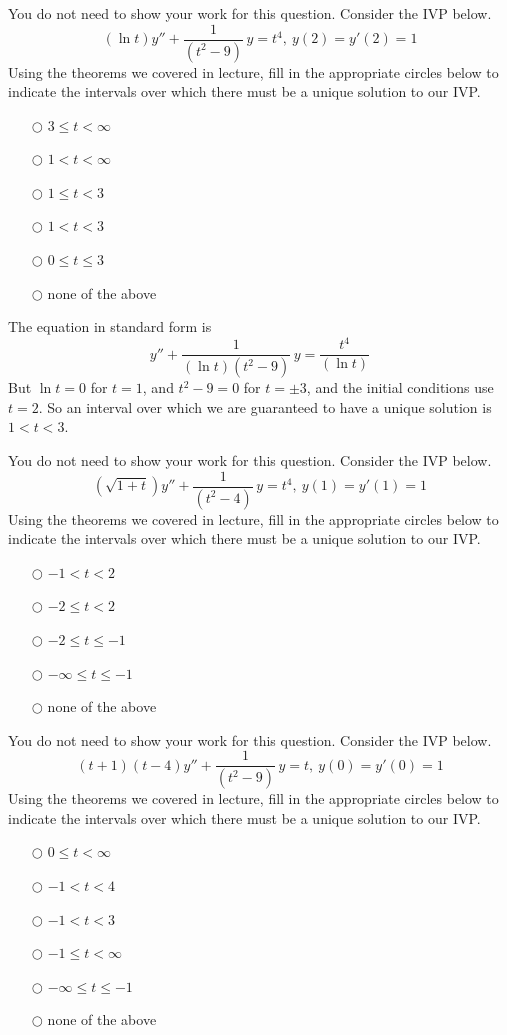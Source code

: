 \ifnum {}    
\question[1] You do not need to show your work for this question. Consider the IVP below.
$$\displaystyle (\ln t) y'' + \frac{1}{(t^2-9)}\,y = t^4, \ y(2) = y'(2)= 1$$   
Using the theorems we covered in lecture, fill in the appropriate circles below to indicate the intervals over which there must be a unique solution to our IVP.
\begin{itemize}
    \item[$\bigcirc$] $3 \le t < \infty$
    \item[$\bigcirc$] $1 < t < \infty$
    \item[$\bigcirc$] $1 \le t < 3$
    \item[$\bigcirc$] $1 < t < 3$
    \item[$\bigcirc$] $0 \le t \le 3$
    \item[$\bigcirc$] none of the above
\end{itemize}
\ifnum {} {\color{DarkBlue} 
The equation in standard form is
$$\displaystyle  y'' + \frac{1}{(\ln t)(t^2-9)}\,y = \frac{t^4}{(\ln t)}$$   
But $\ln t = 0$ for $t=1$, and $t^2-9=0$ for $t = \pm 3$, and the initial conditions use $t=2$. So an interval over which we are guaranteed to have a unique solution is $1<t<3$. 
} 
\else 
\vspace{0cm}
\fi
\fi

\ifnum {}
\question[1] You do not need to show your work for this question. Consider the IVP below.
$$\displaystyle (\sqrt{1+t}) y'' + \frac{1}{(t^2-4)}\,y = t^4, \ y(1) = y'(1)= 1$$   
Using the theorems we covered in lecture, fill in the appropriate circles below to indicate the intervals over which there must be a unique solution to our IVP.
\begin{itemize}
    \item[$\bigcirc$] $-1 < t < 2$
    \item[$\bigcirc$] $-2 \le t < 2$
    \item[$\bigcirc$] $-2 \le t \le -1$
    \item[$\bigcirc$] $-\infty \le t \le -1$
    \item[$\bigcirc$] none of the above
\end{itemize}
\fi

\ifnum {}
\question[1] You do not need to show your work for this question. Consider the IVP below.
$$\displaystyle (t+1)(t-4) y'' + \frac{1}{(t^2-9)}\,y = t, \ y(0) = y'(0)= 1$$   
Using the theorems we covered in lecture, fill in the appropriate circles below to indicate the intervals over which there must be a unique solution to our IVP.
\begin{itemize}
    \item[$\bigcirc$] $0 \le t < \infty$
    \item[$\bigcirc$] $-1 < t < 4$
    \item[$\bigcirc$] $-1 < t < 3$
    \item[$\bigcirc$] $-1 \le t < \infty$
    \item[$\bigcirc$] $-\infty \le t \le -1$
    \item[$\bigcirc$] none of the above
\end{itemize}
\fi


